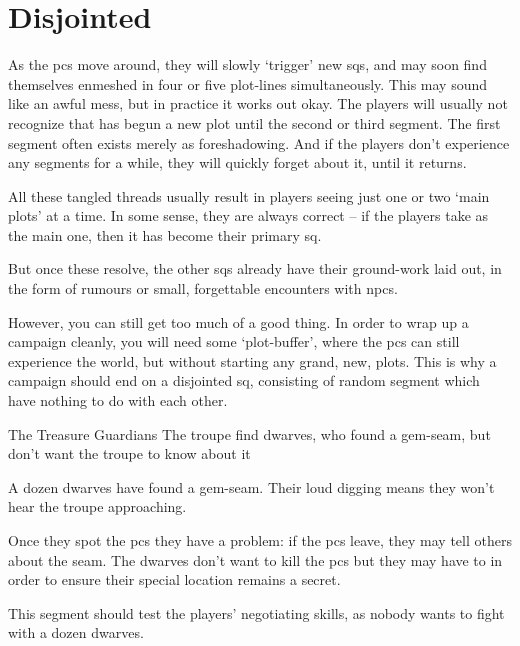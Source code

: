 \section{Disjointed }

\begin{multicols}{2}

\noindent
As the \glspl{pc} move around, they will slowly `trigger' new \glspl{sq}, and may soon find themselves enmeshed in four or five plot-lines simultaneously.
This may sound like an awful mess, but in practice it works out okay.
The players will usually not recognize that  has begun a new plot until the second or third \gls{segment}.
The first \gls{segment} often exists merely as foreshadowing.
And if the players don't experience any \glspl{segment} for a while, they will quickly forget about it, until it returns.

All these tangled threads usually result in players seeing just one or two `main plots' at a time.
In some sense, they are always correct -- if the players take  as the main one, then it has become their primary \gls{sq}.

But once these resolve, the other \glspl{sq} already have their ground-work laid out, in the form of rumours or small, forgettable encounters with \glspl{npc}.

However, you can still get too much of a good thing.
In order to wrap up a campaign cleanly, you will need some `plot-buffer', where the \glspl{pc} can still experience the world, but without starting any grand, new, plots.
This is why a campaign should end on a disjointed \gls{sq}, consisting of random \gls{segment} which have nothing to do with each other.


{The Treasure Guardians}%
{The troupe find dwarves, who found a gem-seam, but don't want the troupe to know about it}%

A dozen dwarves have found a gem-seam.
Their loud digging means they won't hear the troupe approaching.

Once they spot the \glspl{pc} they have a problem: if the \glspl{pc} leave, they may tell others about the seam.
The dwarves don't want to kill the \glspl{pc} but they may have to in order to ensure their special location remains a secret.

This \gls{segment} should test the players' negotiating skills, as nobody wants to fight with a dozen dwarves.


\end{multicols}

